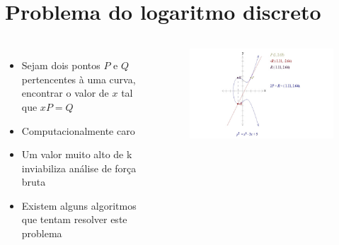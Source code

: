 \documentclass{beamer}
\begin{document}
\section{Problema do logaritmo discreto}
\begin{frame}
  \begin{columns}[c]
      \begin{itemize}
        \item Sejam dois pontos $P$ e $Q$ pertencentes à uma curva, encontrar o valor de $x$ tal que $xP = Q$
        \item Computacionalmente caro
        \item Um valor muito alto de k inviabiliza análise de força bruta
        \item Existem alguns algoritmos que tentam resolver este problema
      \end{itemize}

      \begin{figure}
        \includegraphics[scale=0.3]{multiplicacao_ponto}
      \end{figure}
  \end{columns}
\end{frame}

%
%

\end{document}
